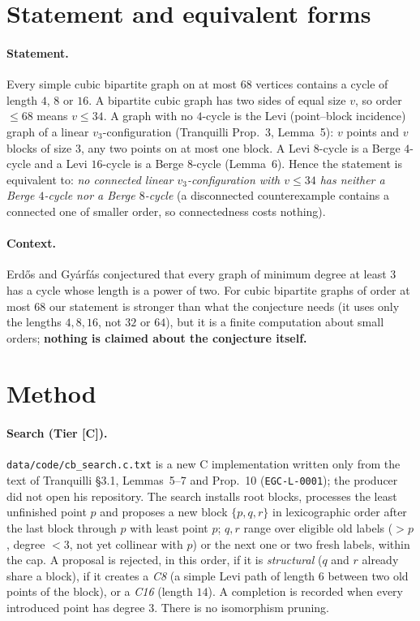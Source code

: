\documentclass[10pt]{article}
\newcommand{\tier}[1]{\textsf{[#1]}}
\newcommand{\tC}{\tier{C}}
\begin{document}
\section{Statement and equivalent forms}\label{sec:setting}
\paragraph{Statement.} Every simple cubic bipartite graph on at most $68$ vertices contains a cycle of length $4$, $8$ or $16$. A bipartite cubic graph has two sides of equal size $v$, so order $\le68$ means $v\le34$. A graph with no $4$-cycle is the Levi (point--block incidence) graph of a linear $v_3$-configuration (Tranquilli Prop.~3, Lemma~5): $v$ points and $v$ blocks of size $3$, any two points on at most one block. A Levi $8$-cycle is a Berge $4$-cycle and a Levi $16$-cycle is a Berge $8$-cycle (Lemma~6). Hence the statement is equivalent to:
\emph{no connected linear $v_3$-configuration with $v\le34$ has neither a Berge $4$-cycle nor a Berge $8$-cycle} (a disconnected counterexample contains a connected one of smaller order, so connectedness costs nothing).

\paragraph{Context.} Erd\H{o}s and Gy\'arf\'as conjectured that every graph of minimum degree at least $3$ has a cycle whose length is a power of two. For cubic bipartite graphs of order at most $68$ our statement is stronger than what the conjecture needs (it uses only the lengths $4,8,16$, not $32$ or $64$), but it is a finite computation about small orders; \textbf{nothing is claimed about the conjecture itself.}

\section{Method}\label{sec:method}
\paragraph{Search (Tier \tC{}).} \texttt{data/code/cb\_search.c.txt} is a new C implementation written only from the text of Tranquilli \S3.1, Lemmas~5--7 and Prop.~10 (\texttt{EGC-L-0001}); the producer did not open his repository. The search installs root blocks, processes the least unfinished point $p$ and proposes a new block $\{p,q,r\}$ in lexicographic order after the last block through $p$ with least point $p$; $q,r$ range over eligible old labels ($>p$, degree $<3$, not yet collinear with $p$) or the next one or two fresh labels, within the cap. A proposal is rejected, in this order, if it is \emph{structural} ($q$ and $r$ already share a block), if it creates a \emph{C8} (a simple Levi path of length $6$ between two old points of the block), or a \emph{C16} (length $14$). A completion is recorded when every introduced point has degree $3$. There is no isomorphism pruning.
\end{document}
